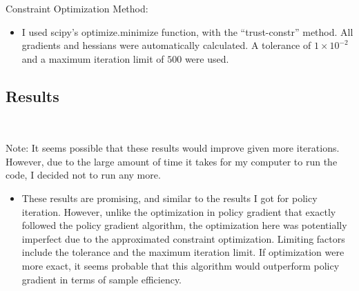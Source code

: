 \documentclass[a4paper]{article}
\begin{document}
Constraint Optimization Method:
\begin{itemize}
    \item I used scipy's optimize.minimize function, with the ``trust-constr''
        method. All gradients and hessians were automatically calculated. A
        tolerance of $1 \times 10^{-2}$ and a maximum iteration limit of
        $500$ were used.
\end{itemize}
\subsection*{Results}
\begin{centering}
    \scalebox{0.6}{} \\
\end{centering}
Note: It seems possible that these results would improve given more iterations.
However, due to the large amount of time it takes for my computer to run the
code, I decided not to run any more.
\begin{itemize}
    \item These results are promising, and similar to the results I got for
        policy iteration. However, unlike the optimization in policy gradient
        that exactly followed the policy gradient algorithm,
        the optimization here was potentially imperfect due to the approximated
        constraint optimization. Limiting factors include the tolerance and the
        maximum iteration limit. If optimization were more exact, it seems
        probable that this algorithm would outperform policy gradient in terms
        of sample efficiency.
\end{itemize}
\end{document}
